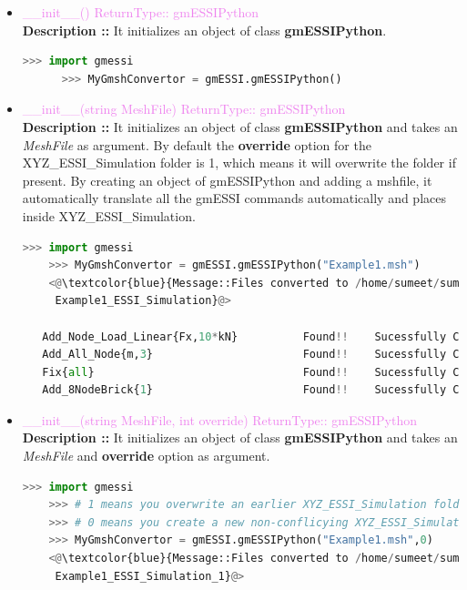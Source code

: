 \documentclass[11pt]{article}
\begin{document}
\begin{itemize}

    \item \textcolor{violet}{\_\_init\_\_() \hfill {ReturnType:: gmESSIPython}} \\
    \textbf{Description ::} It initializes an object of class \textbf{gmESSIPython}. 
    \begin{lstlisting}[language=Python]
      >>> import gmessi
      >>> MyGmshConvertor = gmESSI.gmESSIPython()
    \end{lstlisting} 

    \item \textcolor{violet}{\_\_init\_\_(string MeshFile) \hfill {ReturnType:: gmESSIPython}} \\
    \textbf{Description ::} It initializes an object of class \textbf{gmESSIPython} and takes an \textit{MeshFile} as argument. By default the \textbf{override} option for the XYZ\_ESSI\_Simulation folder is 1, which means it will overwrite the folder if present. By creating an object of gmESSIPython and adding a mshfile, it automatically translate all the gmESSI commands automatically and places inside XYZ\_ESSI\_Simulation. 
    \begin{lstlisting}[language=Python]
    >>> import gmessi
    >>> MyGmshConvertor = gmESSI.gmESSIPython("Example1.msh")
    <@\textcolor{blue}{Message::Files converted to /home/sumeet/sumeet.kumar507@gmail.com/git/gmESSI/
     Example1_ESSI_Simulation}@>

   Add_Node_Load_Linear{Fx,10*kN}          Found!!    Sucessfully Converted
   Add_All_Node{m,3}                       Found!!    Sucessfully Converted
   Fix{all}                                Found!!    Sucessfully Converted
   Add_8NodeBrick{1}                       Found!!    Sucessfully Converted

    \end{lstlisting}

    \item \textcolor{violet}{\_\_init\_\_(string MeshFile, int override) \hfill {ReturnType:: gmESSIPython}} \\
    \textbf{Description ::} It initializes an object of class \textbf{gmESSIPython} and takes an \textit{MeshFile} and \textbf{override} option as argument.
    \begin{lstlisting}[language=Python]
    >>> import gmessi
    >>> # 1 means you overwrite an earlier XYZ_ESSI_Simulation folder if any
    >>> # 0 means you create a new non-conflicying XYZ_ESSI_Simulation_n folder
    >>> MyGmshConvertor = gmESSI.gmESSIPython("Example1.msh",0)
    <@\textcolor{blue}{Message::Files converted to /home/sumeet/sumeet.kumar507@gmail.com/git/gmESSI/
     Example1_ESSI_Simulation_1}@>


\end{lstlisting}
\end{itemize}
\end{document}
